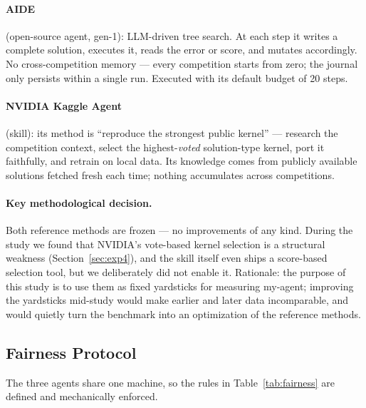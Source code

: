 \documentclass[11pt,a4paper]{article}
\begin{document}
\paragraph{AIDE} (open-source agent, gen-1): LLM-driven tree search. At each step it writes a complete solution, executes it, reads the error or score, and mutates accordingly. No cross-competition memory --- every competition starts from zero; the journal only persists within a single run. Executed with its default budget of 20 steps.

\paragraph{NVIDIA Kaggle Agent} (skill): its method is ``reproduce the strongest public kernel'' --- research the competition context, select the highest-\emph{voted} solution-type kernel, port it faithfully, and retrain on local data. Its knowledge comes from publicly available solutions fetched fresh each time; nothing accumulates across competitions.

\paragraph{Key methodological decision.} Both reference methods are frozen --- no improvements of any kind. During the study we found that NVIDIA's vote-based kernel selection is a structural weakness (Section~\ref{sec:exp4}), and the skill itself even ships a score-based selection tool, but we deliberately did not enable it. Rationale: the purpose of this study is to use them as fixed yardsticks for measuring my-agent; improving the yardsticks mid-study would make earlier and later data incomparable, and would quietly turn the benchmark into an optimization of the reference methods.

\subsection{Fairness Protocol}
\label{sec:fairness}

The three agents share one machine, so the rules in Table~\ref{tab:fairness} are defined and mechanically enforced.
\end{document}
